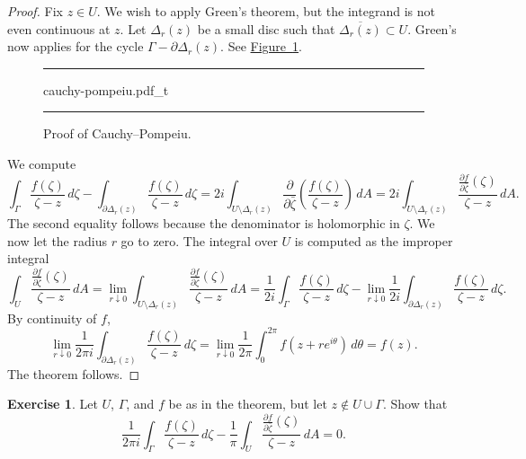 \documentclass[12pt,openany]{book}
\theoremstyle{plain}
\theoremstyle{remark}
\theoremstyle{definition}
\newenvironment{exbox}{%
    \def\FrameCommand{\vrule width 1pt \relax\hspace{10pt}}%
    \MakeFramed{\advance\hsize-\width\FrameRestore}%
}{%
    \endMakeFramed
}
\newenvironment{myfig}{%
\begin{figure}[h!t]
\noindent\rule{\textwidth}{0.5pt}\vspace{12pt}\par\centering}%
{\par\noindent\rule{\textwidth}{0.5pt}
\end{figure}}
\theoremstyle{exercise}
\newtheorem{exercise}{Exercise}[section]
\theoremstyle{example}
\newcommand{\figureref}[1]{\hyperref[#1]{Figure~\ref*{#1}}}
\begin{document}
\begin{proof}
Fix $z \in U$.  We wish to apply Green's theorem,
but the integrand is not even continuous at $z$.
Let $\Delta_r(z)$ be a small disc such that
$\overline{\Delta_r(z)} \subset U$.  Green's now applies
for the cycle $\Gamma - \partial \Delta_r(z)$.
See \figureref{fig:cauchypompeiu}.
\begin{myfig}
{cauchy-pompeiu.pdf_t}
\caption{Proof of Cauchy--Pompeiu.\label{fig:cauchypompeiu}}
\end{myfig}
We compute
\begin{equation*}
\int_{\Gamma} \frac{f(\zeta)}{\zeta-z}\,  d\zeta - 
\int_{\partial \Delta_r(z)} \frac{f(\zeta)}{\zeta-z}\,  d\zeta
=
2i
\int_{U \setminus \Delta_r(z)} \frac{\partial}{\partial \bar{\zeta}} \left(
\frac{f(\zeta)}{\zeta-z} \right) \, dA
=
2i
\int_{U \setminus \Delta_r(z)}  
\frac{\frac{\partial f}{\partial \bar{\zeta}}(\zeta)}{\zeta-z} \, dA .
\end{equation*}
The second equality follows because the denominator is holomorphic in
$\zeta$.
We now let the radius $r$ go to zero.
The integral over $U$ is computed as the improper integral
\begin{equation*}
\int_{U} \frac{\frac{\partial f}{\partial
\bar{\zeta}}(\zeta)}{\zeta-z} \, dA
=
\lim_{r \downarrow 0}
\int_{U \setminus \Delta_r(z)} \frac{\frac{\partial f}{\partial
\bar{\zeta}}(\zeta)}{\zeta-z} \, dA
=
\frac{1}{2i}
\int_{\Gamma} \frac{f(\zeta)}{\zeta-z}\,  d\zeta
- 
\lim_{r \downarrow 0}
\frac{1}{2i}
\int_{\partial \Delta_r(z)} \frac{f(\zeta)}{\zeta-z}\,  d\zeta .
\end{equation*}
By continuity of $f$,
\begin{equation*}
\lim_{r \downarrow 0}
\frac{1}{2\pi i}
\int_{\partial \Delta_r(z)} \frac{f(\zeta)}{\zeta-z}\,  d\zeta
=
\lim_{r \downarrow 0}
\frac{1}{2\pi}
\int_0^{2\pi} f(z + r e^{i\theta})\, d\theta
=
f(z) .
\end{equation*}
The theorem follows.
\end{proof}

\begin{exbox}
\begin{exercise}
Let $U$, $\Gamma$, and $f$ be as in the theorem, but let
$z \notin U \cup \Gamma$.  Show that
\begin{equation*}
\frac{1}{2\pi i}
\int_{\Gamma}
\frac{f(\zeta)}{\zeta-z}
\,
d \zeta
-
\frac{1}{\pi}
\int_{U}
\frac{\frac{\partial f}{\partial \bar{\zeta}}(\zeta)}{\zeta-z}
\,
dA
= 0 .
\end{equation*}
\end{exercise}
\end{exbox}
\end{document}
